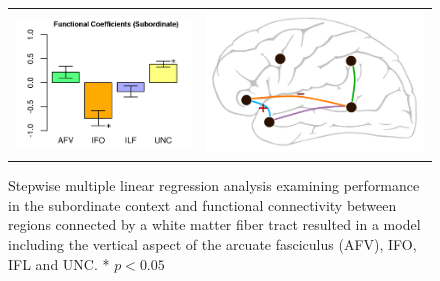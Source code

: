 \begin{figure}[h]
\begin{center}
\begin{tabular}{c c}
\includegraphics[width=0.45\linewidth]{figures/FC_Subordinate2.png} &
\includegraphics[width=0.45\linewidth]{figures/func_diag2.png}
\end{tabular}
\caption{Stepwise multiple linear regression analysis examining performance in the subordinate context and functional connectivity between regions connected by a white matter fiber tract resulted in a model including the vertical aspect of the arcuate fasciculus (AFV), IFO, IFL and UNC. * $p<0.05$}
\label{fig:mlr_fc}
\end{center}
\end{figure}

